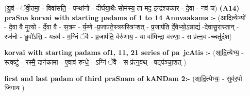 \documentclass[17pt]{extarticle}
\begin{document}
                  \newline
                      (यु॒वं - ॅवी॒तमा॒ - विवा॑सति॒ - पन्था॑नो - दीर्घया॒थैः सोम॑स्य॒ ता मद॒ इन्द्र॑श्चकार - दे॒वा - नव॑ च)  \textbf{(A14)} \newline \newline
\textbf{praSna korvai with starting padams of 1 to 14 Anuvaakams :-} \newline
(आ॒दि॒त्येभ्यो॑ - दे॒वा वै मृ॒त्यो - र्दे॒वा वै - स॒त्रम॑ - र्य॒म्णे -प्र॒जाप॑ते॒स्त्रय॑स्त्रिꣳशत् - प्र॒जाप॑ति र्दे॒वेभ्यो॒ऽन्नाद्यं॑ -देवासु॒रास्तान् - रज॑नो - ध्रु॒वो॑ऽसि॒ - यन्नव॑ - म॒ग्निं ॅवै - प्र॒जाप॑ति॒ र्वरु॑णाय॒ - या वा॑मिन्द्रा वरुणा॒ - स प्र॑त्न॒व -च्चतु॑र्दश) \newline

\textbf{korvai with starting padams of1, 11, 21 series of pa~jcAtis :-} \newline
(आ॒दि॒त्येभ्य॒ - स्त्वष्टु॑ - रस्मै॒ दान॑कामा - ए॒वाव॑ रुन्धे॒ - ऽग्निं ॅवै - स प्र॑त्न॒वथ् - षट्प॑ञ्चा॒शत् ) \newline

\textbf{first and last padam of third praSnam of kANDam 2:-} \newline
(आ॒दि॒त्येभ्यः॒ - सुव॑र॒पो जि॑गाय ) \newline 
\end{document}

